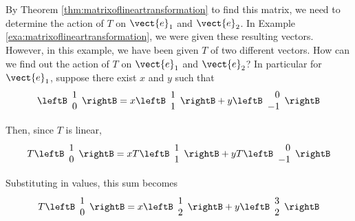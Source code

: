 \begin{solution} By Theorem \ref{thm:matrixoflineartransformation} to find this matrix, we need to determine the action of $T$ on
$\vect{e}_{1}$ and $\vect{e}_{2}$. In Example \ref{exa:matrixoflineartransformation}, we were given these resulting vectors.
However, in this example, we have been given $T$ of two different vectors. How can we find out the action
of $T$ on $\vect{e}_{1}$ and $\vect{e}_{2}$? In particular for $\vect{e}_{1}$, suppose there exist $x$ and $y$ such that
\begin{equation}
\leftB
\begin{array}{r}
1 \\
0
\end{array}
\rightB = x\leftB
\begin{array}{r}
1\\
1
\end{array}
\rightB +y\leftB
\begin{array}{r}
0 \\
-1 
\end{array}
\rightB 
\label{matrixvalues}
\end{equation}

Then, since $T$ is linear,
\begin{equation*}
T\leftB
\begin{array}{r}
1 \\
0 
\end{array}
\rightB  = x T\leftB
\begin{array}{r}
1 \\
1
\end{array}
\rightB +y T\leftB
\begin{array}{r}
0 \\
-1 
\end{array}
\rightB
\end{equation*}

Substituting in values, this sum becomes
\begin{equation}
T\leftB
\begin{array}{r}
1 \\
0 
\end{array}
\rightB = 
 x\leftB
\begin{array}{r}
1 \\
2
\end{array}
\rightB +y\leftB
\begin{array}{r}
3 \\
2
\end{array}
\rightB 
\label{matrixvalues2}
\end{equation}


\end{solution}
